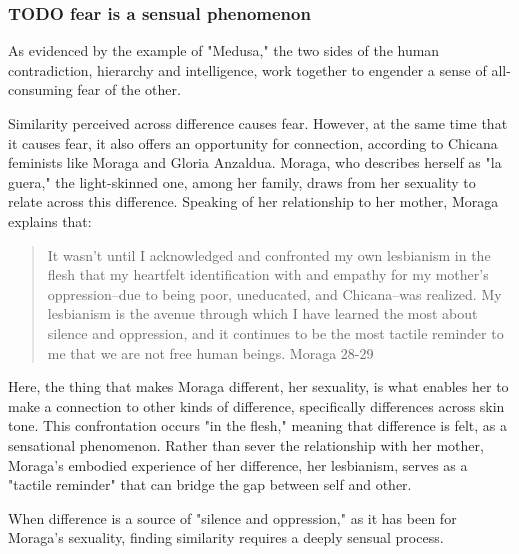 \documentclass[11pt]{article}
\begin{document}
\subsubsection{{\bfseries\sffamily TODO} fear is a sensual phenomenon}
\label{sec:orge165678}
As evidenced by the example of "Medusa," the two sides of the human
contradiction, hierarchy and intelligence, work together to engender a
sense of all-consuming fear of the other.

Similarity perceived across difference causes fear. However, at the
same time that it causes fear, it also offers an opportunity for
connection, according to Chicana feminists like Moraga and Gloria
Anzaldua. Moraga, who describes herself as "la guera," the
light-skinned one, among her family, draws from her sexuality to
relate across this difference. Speaking of her relationship to her
mother, Moraga explains that:
\begin{quote}
It wasn't until I acknowledged and confronted my own lesbianism in the
flesh that my heartfelt identification with and empathy for my
mother's oppression--due to being poor, uneducated, and Chicana--was
realized. My lesbianism is the avenue through which I have learned the
most about silence and oppression, and it continues to be the most
tactile reminder to me that we are not free human beings. Moraga 28-29
\end{quote}
Here, the thing that makes Moraga different, her sexuality, is what
enables her to make a connection to other kinds of difference,
specifically differences across skin tone. This confrontation occurs
"in the flesh," meaning that difference is felt, as a sensational
phenomenon. Rather than sever the relationship with her mother,
Moraga's embodied experience of her difference, her lesbianism, serves
as a "tactile reminder" that can bridge the gap between self and
other. 

When difference is a source of "silence and oppression," as it has
been for Moraga's sexuality, finding similarity requires a deeply
sensual process.
\end{document}
